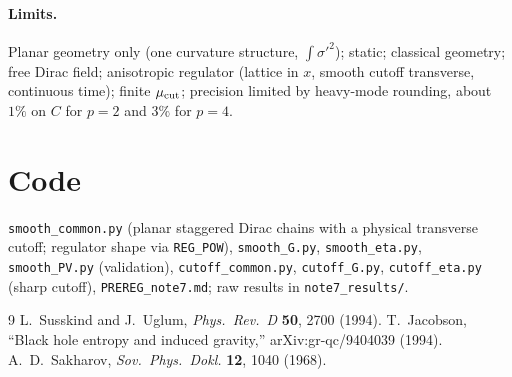 \documentclass[11pt]{article}
\begin{document}
\paragraph{Limits.} Planar geometry only (one curvature structure, $\int\sigma'^2$); static; classical geometry; free Dirac field; anisotropic regulator (lattice in $x$, smooth cutoff transverse, continuous time); finite $\mu_{\rm cut}$; precision limited by heavy-mode rounding, about $1\%$ on $C$ for $p=2$ and $3\%$ for $p=4$.

\section*{Code}
\texttt{smooth\_common.py} (planar staggered Dirac chains with a physical transverse cutoff; regulator shape via \texttt{REG\_POW}), \texttt{smooth\_G.py}, \texttt{smooth\_eta.py}, \texttt{smooth\_PV.py} (validation), \texttt{cutoff\_common.py}, \texttt{cutoff\_G.py}, \texttt{cutoff\_eta.py} (sharp cutoff), \texttt{PREREG\_note7.md}; raw results in \texttt{note7\_results/}.

\begin{thebibliography}{9}
 L.~Susskind and J.~Uglum, \emph{Phys.\ Rev.\ D} \textbf{50}, 2700 (1994).
 T.~Jacobson, ``Black hole entropy and induced gravity,'' arXiv:gr-qc/9404039 (1994).
 A.~D.~Sakharov, \emph{Sov.\ Phys.\ Dokl.} \textbf{12}, 1040 (1968).
\end{thebibliography}
\end{document}
